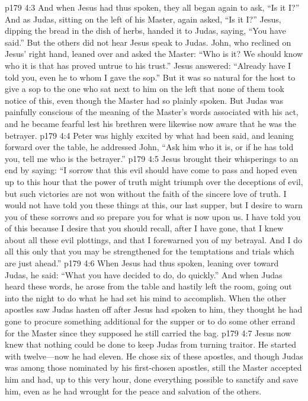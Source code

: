 \vs p179 4:3 And when Jesus had thus spoken, they all began again to ask, “Is it I?” And as Judas, sitting on the left of his Master, again asked, “Is it I?” Jesus, dipping the bread in the dish of herbs, handed it to Judas, saying, \textcolor{ubdarkred}{“You have said.”} But the others did not hear Jesus speak to Judas. John, who reclined on Jesus’ right hand, leaned over and asked the Master: “Who is it? We should know who it is that has proved untrue to his trust.” Jesus answered: \textcolor{ubdarkred}{“Already have I told you, even he to whom I gave the sop.”} But it was so natural for the host to give a sop to the one who sat next to him on the left that none of them took notice of this, even though the Master had so plainly spoken. But Judas was painfully conscious of the meaning of the Master’s words associated with his act, and he became fearful lest his brethren were likewise now aware that he was the betrayer.
\vs p179 4:4 Peter was highly excited by what had been said, and leaning forward over the table, he addressed John, “Ask him who it is, or if he has told you, tell me who is the betrayer.”
\vs p179 4:5 Jesus brought their whisperings to an end by saying: \textcolor{ubdarkred}{“I sorrow that this evil should have come to pass and hoped even up to this hour that the power of truth might triumph over the deceptions of evil, but such victories are not won without the faith of the sincere love of truth. I would not have told you these things at this, our last supper, but I desire to warn you of these sorrows and so prepare you for what is now upon us. I have told you of this because I desire that you should recall, after I have gone, that I knew about all these evil plottings, and that I forewarned you of my betrayal. And I do all this only that you may be strengthened for the temptations and trials which are just ahead.”}
\vs p179 4:6 When Jesus had thus spoken, leaning over toward Judas, he said: \textcolor{ubdarkred}{“What you have decided to do, do quickly.”} And when Judas heard these words, he arose from the table and hastily left the room, going out into the night to do what he had set his mind to accomplish. When the other apostles saw Judas hasten off after Jesus had spoken to him, they thought he had gone to procure something additional for the supper or to do some other errand for the Master since they supposed he still carried the bag.
\pc \vs p179 4:7 Jesus now knew that nothing could be done to keep Judas from turning traitor. He started with twelve---now he had eleven. He chose six of these apostles, and though Judas was among those nominated by his first\hyp{}chosen apostles, still the Master accepted him and had, up to this very hour, done everything possible to sanctify and save him, even as he had wrought for the peace and salvation of the others.
